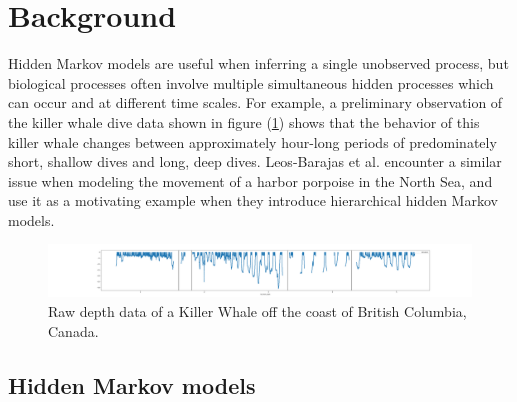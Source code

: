 
\section{Background}

Hidden Markov models are useful when inferring a single unobserved process, but biological processes often involve multiple simultaneous hidden processes which can occur and at different time scales. For example, a preliminary observation of the killer whale dive data shown in figure (\ref{fig:data}) shows that the behavior of this killer whale changes between approximately hour-long periods of predominately short, shallow dives and long, deep dives. Leos-Barajas et al. encounter a similar issue when modeling the movement of a harbor porpoise in the North Sea, and use it as a motivating example when they introduce hierarchical hidden Markov models.

\begin{figure}[h!]
	\centering
	\includegraphics[width=5in]{../Plots/raw_data.png}
	\caption{Raw depth data of a Killer Whale off the coast of British Columbia, Canada.}
	\label{fig:data}
\end{figure}

\subsection{Hidden Markov models}
\label{subsection:HMMs}

